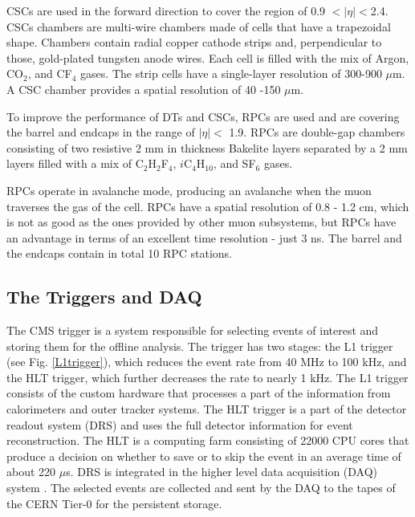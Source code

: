 \begin{normalsize}
CSCs are used in the forward direction to cover the region of 0.9 $ <|\eta|<$2.4. CSCs chambers are multi-wire chambers made of cells  that have a trapezoidal shape. Chambers contain radial copper cathode strips and, perpendicular to those, gold-plated tungsten anode wires. Each cell is filled with the mix of Argon, CO$_2$, and CF$_4$ gases. The strip cells have a single-layer resolution of 300-900 $\mu$m. A CSC chamber provides a spatial resolution of 40 -150 $\mu$m.


To improve the performance of DTs and CSCs, RPCs are used and are covering the barrel and endcaps in the range of $|\eta| <$ 1.9. 
RPCs are double-gap chambers consisting of two resistive 2 mm in thickness Bakelite layers separated by a 2 mm layers filled with a mix of C$_2$H$_2$F$_4$, $i$C$_4$H$_{10}$, and SF$_6$ gases.

RPCs operate in avalanche mode, producing an avalanche when the muon traverses the gas of the cell. RPCs have a spatial resolution of 0.8 - 1.2 cm, which is not as good as the ones provided by other muon subsystems, but RPCs have an advantage in terms of an excellent time resolution - just 3 ns. The barrel and the endcaps contain in total 10 RPC stations.




\subsection{The Triggers and DAQ}

The CMS trigger \cite{Trigger} is a system responsible for selecting events of interest and storing them for the offline analysis. The trigger has two stages: the L1 trigger (see Fig. \ref{L1trigger}), which reduces the event rate from 40 MHz to 100 kHz, and the HLT trigger, which further decreases the rate to nearly 1 kHz. The L1 trigger consists of the custom hardware that processes a part of the information from calorimeters and outer tracker systems. The HLT trigger is a part of the detector readout system (DRS) and uses the full detector information for event reconstruction. The HLT is a computing farm consisting of 22000 CPU cores that produce a decision on whether to save or to skip the event in an average time of about 220 $\mu$s. DRS is integrated in the higher level data acquisition (DAQ) system \cite{DAQ}. The selected events are collected and sent by the DAQ to the tapes of the CERN Tier-0 for the persistent storage. 



\end{normalsize}
